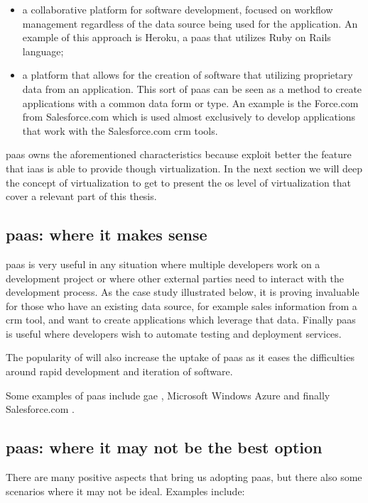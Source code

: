 \begin{itemize}
	\item{a collaborative platform for software development, focused on workflow management regardless
		of the data source being used for the application. An example of this approach is Heroku, a
		\ac{paas} that utilizes Ruby on Rails language;}
	\item{a platform that allows for the creation of software that utilizing proprietary data from an
		application. This sort of \ac{paas} can be seen as a method to create applications with a common
		data form or type. An example is the Force.com from Salesforce.com which is used almost exclusively
		to develop applications that work with the Salesforce.com \ac{crm} tools.}
\end{itemize}

\ac{paas} owns the aforementioned characteristics because exploit better the feature that \ac{iaas}
is able to provide though virtualization. In the next section we will deep the concept of virtualization
to get to present the \acs{os} level of virtualization that cover a relevant part of this thesis.

\subsection{\acs{paas}: where it makes sense}
\label{sec:problemSpace-paas-whereToUse}
\ac{paas} is very useful in any situation where multiple developers work on a development project or
where other external parties need to interact with the development process. As the case study illustrated
below, it is proving invaluable for those who have an existing data source, for example sales information
from a \ac{crm} tool, and want to create applications which leverage that data. Finally \ac{paas} is useful
where developers wish to automate testing and deployment services.

The popularity of  will also increase the uptake of \ac{paas} as it eases the
difficulties around rapid development and iteration of software.

Some examples of \ac{paas} include \ac{gae} \cite{googleAppEngine}, Microsoft Windows Azure
\cite{windowsAzure} and finally Salesforce.com \cite{salesforcePlatform}.

\subsection{\acs{paas}: where it may not be the best option}
\label{sec:problemSpace-paas-whereNotToUse}
There are many positive aspects that bring us adopting \ac{paas}, but there also some scenarios where it
may not be ideal. Examples include:

